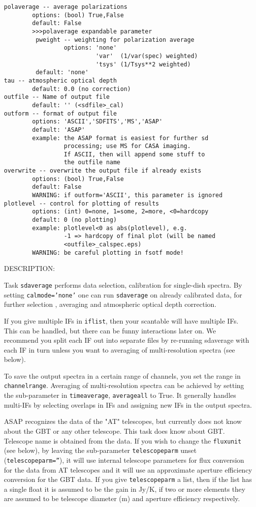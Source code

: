 \begin{verbatim}
polaverage -- average polarizations
        options: (bool) True,False
        default: False
        >>>polaverage expandable parameter
         pweight -- weighting for polarization average
                 options: 'none'
                          'var'  (1/var(spec) weighted)
                          'tsys' (1/Tsys**2 weighted)
         default: 'none'
tau -- atmospheric optical depth
        default: 0.0 (no correction)
outfile -- Name of output file
        default: '' (<sdfile>_cal)
outform -- format of output file
        options: 'ASCII','SDFITS','MS','ASAP'
        default: 'ASAP'
        example: the ASAP format is easiest for further sd
                 processing; use MS for CASA imaging.
                 If ASCII, then will append some stuff to
                 the outfile name
overwrite -- overwrite the output file if already exists
        options: (bool) True,False
        default: False
        WARNING: if outform='ASCII', this parameter is ignored
plotlevel -- control for plotting of results
        options: (int) 0=none, 1=some, 2=more, <0=hardcopy
        default: 0 (no plotting)
        example: plotlevel<0 as abs(plotlevel), e.g.
                 -1 => hardcopy of final plot (will be named
                 <outfile>_calspec.eps)
        WARNING: be careful plotting in fsotf mode!

\end{verbatim}

  DESCRIPTION:

  Task {\tt sdaverage} performs data selection, calibration for single-dish
  spectra.  By setting {\tt calmode='none'}
  one can run {\tt sdaverage} on already calibrated data, for further selection
  , averaging and atmospheric optical depth correction.

  If you give multiple IFs in {\tt iflist}, then your scantable will have
  multiple IFs.  This can be handled, but there can be funny interactions
  later on.  We recommend you split each IF out into separate files
  by re-running sdaverage with each IF in turn unless you want to averaging of
  multi-resolution spectra (see below).

  To save the output spectra in a certain range of 
  channels, you set the range in {\tt channelrange}.
  Averaging of multi-resolution
  spectra can be achieved by setting the sub-parameter in {\tt timeaverage}, {\tt averageall} 
  to True. It generally handles multi-IFs by selecting overlaps in IFs and assigning
  new IFs in the output spectra.

  ASAP recognizes the data of the "AT" telescopes, but currently
  does not know about the GBT or any other telescope. This task
  does know about GBT. Telescope name is obtained from the data.
  If you wish to change the {\tt fluxunit} (see below), by leaving
  the sub-parameter {\tt telescopeparm} unset ({\tt telescopeparm=''}),
  it will use internal telescope parameters for
  flux conversion for the data from AT telescopes and it will use an
  approximate aperture efficiency conversion for the GBT data.
  If you give {\tt telescopeparm} a list, then if the list has a single float it
  is assumed to be the gain in Jy/K, if two or more elements they are assumed
  to be telescope diameter (m) and aperture efficiency
  respectively.

